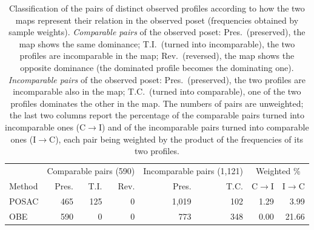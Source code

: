 \begin{table}[ht]
\centering
\caption{Classification of the pairs of distinct observed profiles according to how the two maps represent their relation in the observed poset (frequencies obtained by sample weights). \textit{Comparable pairs} of the observed poset: Pres.\ (preserved), the map shows the same dominance; T.I.\ (turned into incomparable), the two profiles are incomparable in the map; Rev.\ (reversed), the map shows the opposite dominance (the dominated profile becomes the dominating one). \textit{Incomparable pairs} of the observed poset: Pres.\ (preserved), the two profiles are incomparable also in the map; T.C.\ (turned into comparable), one of the two profiles dominates the other in the map. The numbers of pairs are unweighted; the last two columns report the percentage of the comparable pairs turned into incomparable ones (C$\to$I) and of the incomparable pairs turned into comparable ones (I$\to$C), each pair being weighted by the product of the frequencies of its two profiles.}
\label{tab:fate}
\small
\begin{tabular}{lrrrrrrr}
\hline
 & \multicolumn{3}{c}{Comparable pairs (590)} & \multicolumn{2}{c}{Incomparable pairs (1,121)} & \multicolumn{2}{c}{Weighted \%}\\
Method & Pres. & T.I. & Rev. & Pres. & T.C. & C$\to$I & I$\to$C\\
\hline
POSAC & 465 & 125 & 0 & 1,019 & 102 & 1.29 & 3.99\\
OBE & 590 & 0 & 0 & 773 & 348 & 0.00 & 21.66\\
\hline
\end{tabular}
\end{table}
